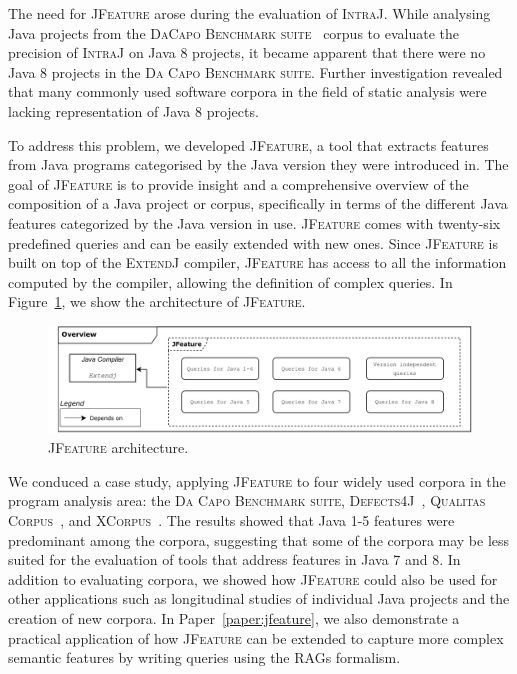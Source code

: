 The need for \textsc{JFeature} arose during the evaluation of \textsc{IntraJ}.
While analysing Java projects from the \textsc{DaCapo Benchmark suite}~\cite{DaCapo:paper} corpus to evaluate the precision
of \textsc{IntraJ} on Java 8 projects, it became apparent that there were no Java 8 projects
in the \textsc{Da Capo Benchmark suite}. Further investigation revealed that many
commonly used software corpora in the field of static analysis were lacking
representation of Java 8 projects.

To address this problem, we developed \textsc{JFeature}, a tool that extracts features from
Java programs categorised by the Java version they were introduced in.
The goal of \textsc{JFeature} is to provide insight and a comprehensive overview of
the composition of a Java project or corpus, specifically in terms of the different
Java features categorized by the Java version in use.
\textsc{JFeature} comes with twenty-six predefined queries and can be easily extended
with new ones. Since \textsc{JFeature} is built on top of the \textsc{ExtendJ} compiler, \textsc{JFeature} has access
to all the information computed by the compiler, allowing the definition of complex
queries.
In Figure~\ref{fig:JFeature}, we show the architecture of \textsc{JFeature}.
\begin{figure}[H]
  \centering
  \includegraphics[width=1\textwidth]{kappa/img/JFeature.pdf}
  \caption{\label{fig:JFeature} \textsc{JFeature} architecture.}
\end{figure}

We conduced a case study, applying \textsc{JFeature} to four widely used corpora in the
program analysis area: the \textsc{Da Capo Benchmark suite}, \textsc{Defects4J}~\cite{just2014defects4j},
\textsc{Qualitas Corpus}~\cite{QualitasCorpus:APSEC:2010}, and \textsc{XCorpus}~\cite{dietrich2017xcorpus}.
The results showed that Java 1-5 features were predominant among the corpora,
suggesting that some of the corpora may be less suited for the evaluation of
tools that address features in Java 7 and 8.
In addition to evaluating corpora, we showed how \textsc{JFeature} could also be used for other
applications such as longitudinal studies of individual Java projects and the creation
of new corpora. In Paper~\ref{paper:jfeature}, we also demonstrate a practical application of how \textsc{JFeature} can
be extended to capture more complex semantic features by writing queries using the RAGs formalism.



